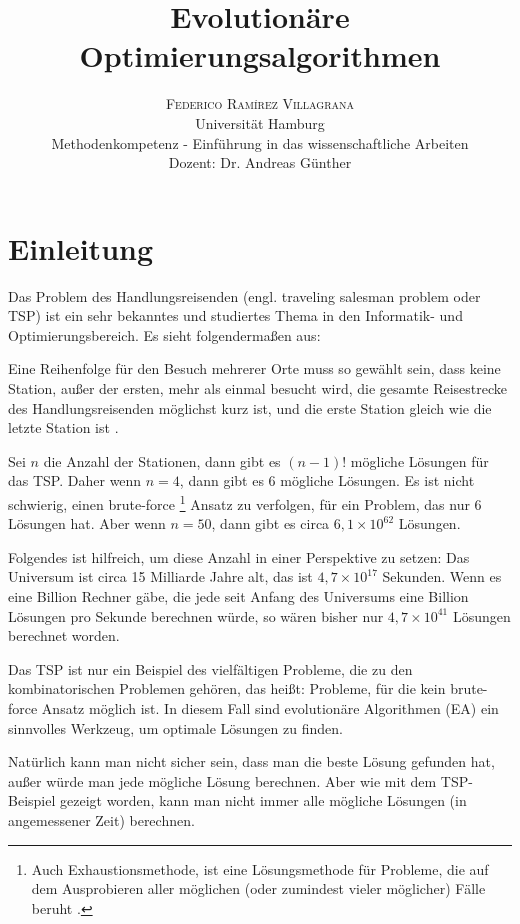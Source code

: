 \documentclass[twoside,twocolumn]{article}
\title{Evolutionäre Optimierungsalgorithmen} %
\author {
	\textsc{Federico Ramírez Villagrana} \\[1ex]
	\normalsize Universität Hamburg \\
	\normalsize Methodenkompetenz - Einführung in das wissenschaftliche Arbeiten \\
	\normalsize Dozent: Dr. Andreas Günther
}
\date{} %
\newcommand{\e}[1]{\times 10^{#1}}
\begin{document}
\maketitle


\section{Einleitung}
Das Problem des Handlungsreisenden (engl. traveling salesman problem oder TSP) ist ein sehr bekanntes und studiertes Thema in den Informatik- und Optimierungsbereich. Es sieht folgendermaßen aus:\par
Eine Reihenfolge für den Besuch mehrerer Orte muss so gewählt sein, dass keine Station, außer der ersten, mehr als einmal besucht wird, die gesamte Reisestrecke des Handlungsreisenden möglichst kurz ist, und die erste Station gleich wie die letzte Station ist \cite{wiki_tsp}.\par
Sei $n$ die Anzahl der Stationen, dann gibt es $(n-1)!$ mögliche Lösungen für das TSP. Daher wenn $n=4$, dann gibt es $6$ mögliche Lösungen. Es ist nicht schwierig, einen brute-force \footnote{Auch Exhaustionsmethode, ist eine Lösungsmethode für Probleme, die auf dem Ausprobieren aller möglichen (oder zumindest vieler möglicher) Fälle beruht \cite{wiki_brute_force}.} Ansatz zu verfolgen, für ein Problem, das nur 6 Lösungen hat. Aber wenn $n=50$, dann gibt es circa $6,1\e{62}$ Lösungen.\par
Folgendes ist hilfreich, um diese Anzahl in einer Perspektive zu setzen: Das Universum ist circa 15 Milliarde Jahre alt, das ist $4,7\e{17}$ Sekunden. Wenn es eine Billion Rechner gäbe, die jede seit Anfang des Universums eine Billion Lösungen pro Sekunde berechnen würde, so wären bisher nur $4,7\e{41}$ Lösungen berechnet worden.\par
Das TSP ist nur ein Beispiel des vielfältigen Probleme, die zu den kombinatorischen Problemen gehören, das heißt: Probleme, für die kein brute-force Ansatz möglich ist. In diesem Fall sind evolutionäre Algorithmen (EA) ein sinnvolles Werkzeug, um optimale Lösungen zu finden.\par
Natürlich kann man nicht sicher sein, dass man die beste Lösung gefunden hat, außer würde man jede mögliche Lösung berechnen. Aber wie mit dem TSP-Beispiel gezeigt worden, kann man nicht immer alle mögliche Lösungen (in angemessener Zeit) berechnen.
\end{document}
